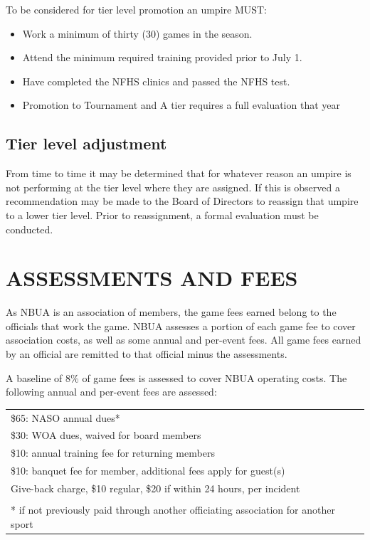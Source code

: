 \documentclass[letterpaper,11pt,colorlinks=true,allcolors=blue]{article}
\begin{document}
To be considered for tier level promotion an umpire MUST: 
\begin{itemize}
\item  Work a minimum of thirty (30) games in the season.
\item  Attend the minimum required training provided prior to July 1.
\item  Have completed the NFHS clinics and passed the NFHS test.
\item  Promotion to Tournament and A tier requires a full evaluation that year
\end{itemize}

\subsection*{Tier level adjustment}
From time to time it may be determined that for whatever reason an umpire is not performing at the tier level where they are assigned. If this is observed a recommendation may be made to the Board of Directors to reassign that umpire to a lower tier level. Prior to reassignment, a formal evaluation must be conducted.

\newpage
\section{ASSESSMENTS AND FEES}
As NBUA is an association of members, the game fees earned belong to the officials that work the game.  NBUA assesses a portion of each game fee to cover association costs, as well as some annual and per-event fees.  All game fees earned by an official are remitted to that official minus the assessments.

A baseline of 8\% of game fees is assessed to cover NBUA operating costs.  The following annual and per-event fees are assessed:

\begin{tabular}{l}
\\
\hline\hline
\$65: NASO annual dues* \\
\$30: WOA dues, waived for board members \\
\$10: annual training fee for returning members \\
\$10: banquet fee for member, additional fees apply for guest(s) \\
Give-back charge, \$10 regular, \$20 if within 24 hours, per incident \\
\hline\hline
\\
* if not previously paid through another officiating association for another sport \\ 
\end{tabular}
\end{document}
